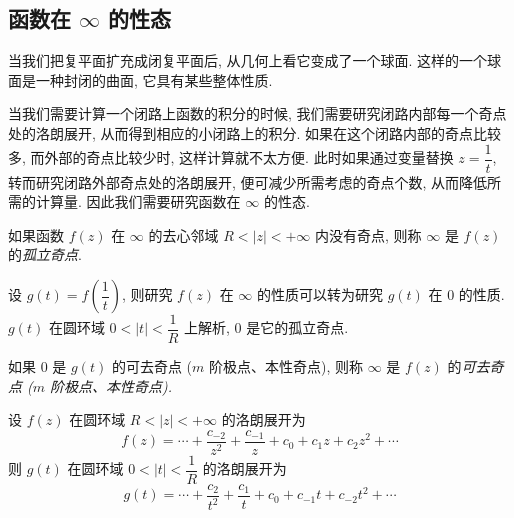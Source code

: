 \subsection{函数在 \texorpdfstring{$\infty$}{∞} 的性态}

当我们把复平面扩充成闭复平面后, 从几何上看它变成了一个球面.
这样的一个球面是一种封闭的曲面, 它具有某些整体性质.

当我们需要计算一个闭路上函数的积分的时候,
我们需要研究闭路内部每一个奇点处的洛朗展开,
从而得到相应的小闭路上的积分.
如果在这个闭路内部的奇点比较多, 而外部的奇点比较少时, 这样计算就不太方便.
此时如果通过变量替换 $z=\dfrac1t$, 转而研究闭路外部奇点处的洛朗展开,
便可减少所需考虑的奇点个数, 从而降低所需的计算量.
因此我们需要研究函数在 $\infty$ 的性态.

\begin{definition}
	如果函数 $f(z)$ 在 $\infty$ 的去心邻域 $R<|z|<+\infty$ 内没有奇点, 则称 $\infty$ 是 $f(z)$ 的\emph{孤立奇点}.
\end{definition}

设 $g(t)=f\left(\dfrac1t\right)$, 则研究 $f(z)$ 在 $\infty$ 的性质可以转为研究 $g(t)$ 在 $0$ 的性质.
$g(t)$ 在圆环域 $0<|t|<\dfrac1R$ 上解析, $0$ 是它的孤立奇点.

\begin{definition}
	如果 $0$ 是 $g(t)$ 的可去奇点 ($m$ 阶极点、本性奇点), 则称 $\infty$ 是 $f(z)$ 的\emph{可去奇点 ($m$ 阶极点、本性奇点).}
\end{definition}

设 $f(z)$ 在圆环域 $R<|z|<+\infty$ 的洛朗展开为
\[f(z)=\cdots+\frac{c_{-2}}{z^2}+\frac{c_{-1}}{z}+c_0+c_1z+c_2z^2+\cdots\]
则 $g(t)$ 在圆环域 $0<|t|<\dfrac1R$ 的洛朗展开为
\[g(t)=\cdots+\frac{c_2}{t^2}+\frac{c_1}t+c_0+c_{-1}t+c_{-2}t^2+\cdots\]

